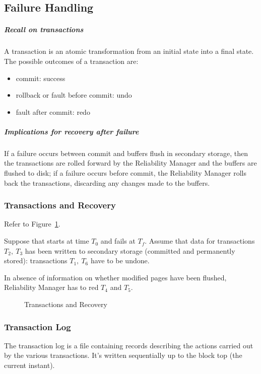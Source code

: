 \documentclass[english]{article}
\begin{document}
\subsection{Failure Handling}

\subparagraph*{Recall on transactions}
A transaction is an atomic transformation from an initial state into a final state.
The possible outcomes of a transaction are:

\begin{itemize}
  \item commit: success
  \item rollback or fault before commit: undo
  \item fault after commit: redo
\end{itemize}

\subparagraph*{Implications for recovery after failure}
If a failure occurs between commit and buffers flush in secondary storage, then the transactions are rolled forward by the Reliability Manager and the buffers are flushed to disk;
if a failure occurs before commit, the Reliability Manager rolls back the transactions, discarding any changes made to the buffers.

\subsubsection{Transactions and Recovery}

Refer to Figure~\ref{fig:transaction-recovery}.

Suppose that \dbms starts at time \(T_0\) and fails at \(T_f\).
Assume that data for transactions \(T_2,\ T_3\) has been written to secondary storage (committed and permanently stored):
transactions \(T_1,\ T_6\) have to be undone.

In absence of information on whether modified pages have been flushed, Reliability Manager has to red \(T_4\) and \(T_5\).

\begin{figure}[htbp]
  \centering
  \bigskip
  \caption{Transactions and Recovery}
  \label{fig:transaction-recovery}
  \bigskip
\end{figure}

\subsubsection{Transaction Log}

The transaction log is a file containing records describing the actions carried out by the various transactions.
It's written sequentially up to the block top (the current instant).
\end{document}
